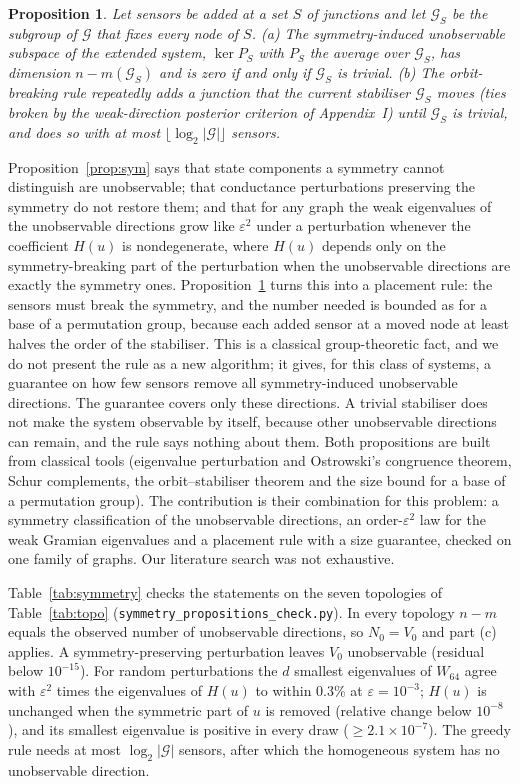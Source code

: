 \documentclass[conference]{IEEEtran}
\newtheorem{proposition}{Proposition}
\begin{document}
\begin{proposition}\label{prop:orbit}
Let sensors be added at a set $S$ of junctions and let $\mathcal G_S$ be the subgroup of $\mathcal G$ that fixes every node of $S$. (a) The symmetry-induced unobservable subspace of the extended system, $\ker P_S$ with $P_S$ the average over $\mathcal G_S$, has dimension $n-m(\mathcal G_S)$ and is zero if and only if $\mathcal G_S$ is trivial. (b) The orbit-breaking rule \emph{repeatedly adds a junction that the current stabiliser $\mathcal G_S$ moves} (ties broken by the weak-direction posterior criterion of Appendix~I) until $\mathcal G_S$ is trivial, and does so with at most $\lfloor\log_2|\mathcal G|\rfloor$ sensors.
\end{proposition}

Proposition~\ref{prop:sym} says that state components a symmetry cannot distinguish are unobservable; that conductance perturbations preserving the symmetry do not restore them; and that for any graph the weak eigenvalues of the unobservable directions grow like $\varepsilon^2$ under a perturbation whenever the coefficient $H(u)$ is nondegenerate, where $H(u)$ depends only on the symmetry-breaking part of the perturbation when the unobservable directions are exactly the symmetry ones. Proposition~\ref{prop:orbit} turns this into a placement rule: the sensors must break the symmetry, and the number needed is bounded as for a base of a permutation group, because each added sensor at a moved node at least halves the order of the stabiliser. This is a classical group-theoretic fact, and we do not present the rule as a new algorithm; it gives, for this class of systems, a guarantee on how few sensors remove all symmetry-induced unobservable directions. The guarantee covers only these directions. A trivial stabiliser does not make the system observable by itself, because other unobservable directions can remain, and the rule says nothing about them. Both propositions are built from classical tools (eigenvalue perturbation and Ostrowski's congruence theorem, Schur complements, the orbit--stabiliser theorem and the size bound for a base of a permutation group). The contribution is their combination for this problem: a symmetry classification of the unobservable directions, an order-$\varepsilon^2$ law for the weak Gramian eigenvalues and a placement rule with a size guarantee, checked on one family of graphs. Our literature search was not exhaustive.

Table~\ref{tab:symmetry} checks the statements on the seven topologies of Table~\ref{tab:topo} (\texttt{symmetry\_propositions\_check.py}). In every topology $n-m$ equals the observed number of unobservable directions, so $N_0=V_0$ and part (c) applies. A symmetry-preserving perturbation leaves $V_0$ unobservable (residual below $10^{-15}$). For random perturbations the $d$ smallest eigenvalues of $W_{64}$ agree with $\varepsilon^2$ times the eigenvalues of $H(u)$ to within $0.3\%$ at $\varepsilon=10^{-3}$; $H(u)$ is unchanged when the symmetric part of $u$ is removed (relative change below $10^{-8}$), and its smallest eigenvalue is positive in every draw ($\ge2.1\times10^{-7}$). The greedy rule needs at most $\log_2|\mathcal G|$ sensors, after which the homogeneous system has no unobservable direction.
\end{document}
